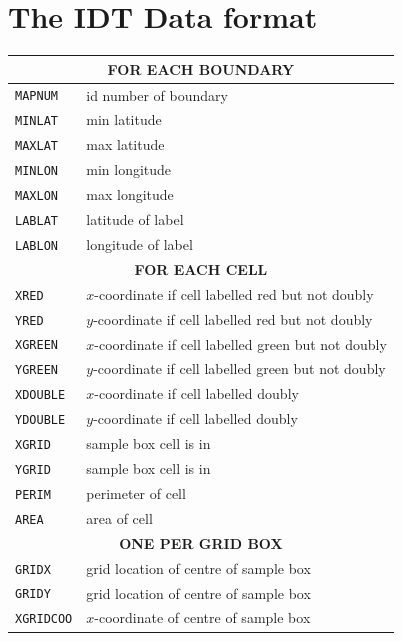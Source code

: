 \documentclass{article}
\begin{document}
\section{The IDT Data format}
\label{manual:sec:reading-data}

\begin{table}
  \begin{tabular}{ll}
    \hline
    \multicolumn{2}{c}{\textbf{FOR EACH BOUNDARY}} \\
    \hline
    \texttt{MAPNUM}   & id number of boundary \\  
    \texttt{MINLAT}   & min latitude      \\
    \texttt{MAXLAT}   & max latitude      \\
    \texttt{MINLON}   & min longitude     \\
    \texttt{MAXLON}   & max longitude     \\
    \texttt{LABLAT}   & latitude of label \\
    \texttt{LABLON}   & longitude of label\\
    \hline
    \multicolumn{2}{c}{\textbf{FOR EACH CELL}} \\
    \hline
    \texttt{XRED}     & $x$-coordinate if cell labelled red but not doubly\\
    \texttt{YRED}     & $y$-coordinate if cell labelled red but not doubly\\
    \texttt{XGREEN}   & $x$-coordinate if cell labelled green but not doubly\\
    \texttt{YGREEN}   & $y$-coordinate if cell labelled green but not doubly\\
    \texttt{XDOUBLE}  & $x$-coordinate if cell labelled doubly\\ 
    \texttt{YDOUBLE}  & $y$-coordinate if cell labelled doubly\\
    \texttt{XGRID}    & sample box cell is in \\
    \texttt{YGRID}    & sample box cell is in \\
    \texttt{PERIM}    & perimeter of cell \\
    \texttt{AREA}     & area of cell \\
    \hline
    \multicolumn{2}{c}{\textbf{ONE PER GRID BOX}} \\
    \hline
    \texttt{GRIDX}    & grid location of centre of sample box \\
    \texttt{GRIDY}    & grid location of centre of sample box \\
    \texttt{XGRIDCOO} & $x$-coordinate of centre of sample box \\

\end{tabular}
\end{table}
\end{document}
